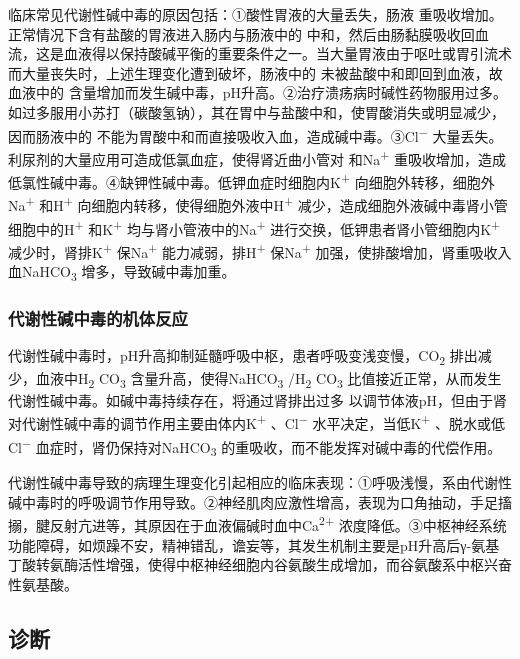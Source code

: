 临床常见代谢性碱中毒的原因包括：①酸性胃液的大量丢失，肠液{}
重吸收增加。正常情况下含有盐酸的胃液进入肠内与肠液中的{}
中和，然后由肠黏膜吸收回血流，这是血液得以保持酸碱平衡的重要条件之一。当大量胃液由于呕吐或胃引流术而大量丧失时，上述生理变化遭到破坏，肠液中的{}
未被盐酸中和即回到血液，故血液中的{}
含量增加而发生碱中毒，pH升高。②治疗溃疡病时碱性药物服用过多。如过多服用小苏打（碳酸氢钠），其在胃中与盐酸中和，使胃酸消失或明显减少，因而肠液中的{}
不能为胃酸中和而直接吸收入血，造成碱中毒。③Cl\textsuperscript{−}
大量丢失。利尿剂的大量应用可造成低氯血症，使得肾近曲小管对{}
和Na\textsuperscript{+}
重吸收增加，造成低氯性碱中毒。④缺钾性碱中毒。低钾血症时细胞内K\textsuperscript{+}
向细胞外转移，细胞外Na\textsuperscript{+} 和H\textsuperscript{+}
向细胞内转移，使得细胞外液中H\textsuperscript{+}
减少，造成细胞外液碱中毒肾小管细胞中的H\textsuperscript{+}
和K\textsuperscript{+} 均与肾小管液中的Na\textsuperscript{+}
进行交换，低钾患者肾小管细胞内K\textsuperscript{+}
减少时，肾排K\textsuperscript{+} 保Na\textsuperscript{+}
能力减弱，排H\textsuperscript{+} 保Na\textsuperscript{+}
加强，使排酸增加，肾重吸收入血NaHCO\textsubscript{3}
增多，导致碱中毒加重。

\subsubsection{代谢性碱中毒的机体反应}

代谢性碱中毒时，pH升高抑制延髓呼吸中枢，患者呼吸变浅变慢，CO\textsubscript{2}
排出减少，血液中H\textsubscript{2} CO\textsubscript{3}
含量升高，使得NaHCO\textsubscript{3} /H\textsubscript{2}
CO\textsubscript{3}
比值接近正常，从而发生代谢性碱中毒。如碱中毒持续存在，将通过肾排出过多{}
以调节体液pH，但由于肾对代谢性碱中毒的调节作用主要由体内K\textsuperscript{+}
、Cl\textsuperscript{−} 水平决定，当低K\textsuperscript{+}
、脱水或低Cl\textsuperscript{−} 血症时，肾仍保持对NaHCO\textsubscript{3}
的重吸收，而不能发挥对碱中毒的代偿作用。

代谢性碱中毒导致的病理生理变化引起相应的临床表现：①呼吸浅慢，系由代谢性碱中毒时的呼吸调节作用导致。②神经肌肉应激性增高，表现为口角抽动，手足搐搦，腱反射亢进等，其原因在于血液偏碱时血中Ca\textsuperscript{2+}
浓度降低。③中枢神经系统功能障碍，如烦躁不安，精神错乱，谵妄等，其发生机制主要是pH升高后γ-氨基丁酸转氨酶活性增强，使得中枢神经细胞内谷氨酸生成增加，而谷氨酸系中枢兴奋性氨基酸。

\subsection{诊断}

